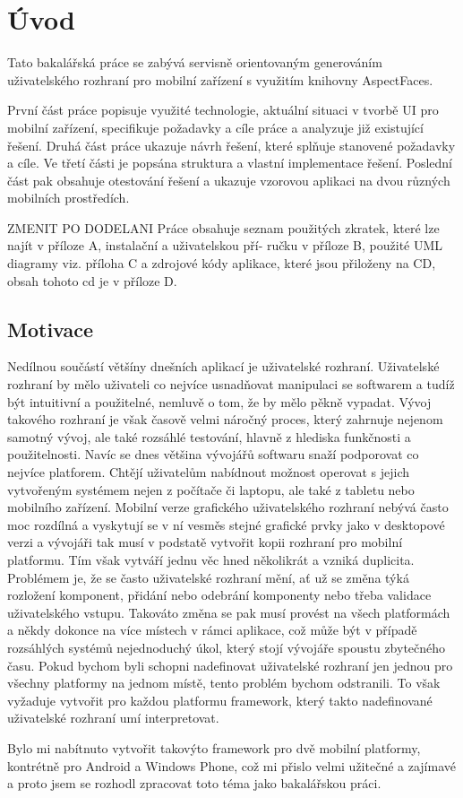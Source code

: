 \chapter{Úvod}
Tato bakalářská práce se zabývá servisně orientovaným generováním uživatelského rozhraní pro mobilní zařízení s využitím knihovny AspectFaces. 

První část práce popisuje využité technologie, aktuální situaci v tvorbě UI pro mobilní zařízení, specifikuje požadavky a cíle práce a analyzuje již existující řešení. Druhá část práce ukazuje návrh řešení, které splňuje stanovené požadavky a cíle. Ve třetí části je popsána struktura a vlastní implementace řešení. Poslední část pak obsahuje otestování řešení a ukazuje vzorovou aplikaci na dvou různých mobilních prostředích.

ZMENIT PO DODELANI
Práce obsahuje seznam použitých zkratek, které lze najít v příloze A, instalační a uživatelskou pří-
ručku v příloze B, použité UML diagramy viz. příloha C a zdrojové kódy
aplikace, které jsou přiloženy na CD, obsah tohoto cd je v příloze D.
 

\section{Motivace}
Nedílnou součástí většíny dnešních aplikací je uživatelské rozhraní. Uživatelské rozhraní by mělo uživateli co nejvíce usnadňovat manipulaci se softwarem a tudíž být intuitivní a použitelné, nemluvě o tom, že by mělo pěkně vypadat. Vývoj takového rozhraní je však časově velmi náročný proces, který zahrnuje nejenom samotný vývoj, ale také rozsáhlé testování, hlavně z hlediska funkčnosti a použitelnosti. Navíc se dnes většina vývojářů softwaru snaží podporovat co nejvíce platforem. Chtějí uživatelům nabídnout možnost operovat s jejich vytvořeným systémem nejen z počítače či laptopu, ale také z tabletu nebo mobilního zařízení. Mobilní verze grafického uživatelského rozhraní nebývá často moc rozdílná a vyskytují se v ní vesměs stejné grafické prvky jako v desktopové verzi a vývojáři tak musí v podstatě vytvořit kopii rozhraní pro mobilní platformu. Tím však vytváří jednu věc hned několikrát a vzniká duplicita. Problémem je, že se často uživatelské rozhraní mění, ať už se změna týká rozložení komponent, přidání nebo odebrání komponenty nebo třeba validace uživatelského vstupu. Takováto změna se pak musí provést na všech platformách a někdy dokonce na více místech v rámci aplikace, což může být v případě rozsáhlých systémů nejednoduchý úkol, který stojí vývojáře spoustu zbytečného času. Pokud bychom byli schopni nadefinovat uživatelské rozhraní jen jednou pro všechny platformy na jednom místě, tento problém bychom odstranili. To však vyžaduje vytvořit pro každou platformu framework, který takto nadefinované uživatelské rozhraní umí interpretovat. 

Bylo mi nabítnuto vytvořit takovýto framework pro dvě mobilní platformy, kontrétně pro Android a Windows Phone, což mi přislo velmi užitečné a zajímavé a proto jsem se rozhodl zpracovat toto téma jako bakalářskou práci.
